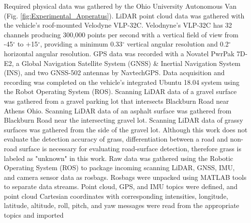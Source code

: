 \documentclass[journal,onecolumn]{IEEEtran}
\begin{document}
			{Required physical data was gathered by the Ohio University Autonomous Van (Fig. \ref{fig:Experimental_Apperatus}). LiDAR point cloud data was gathered with the vehicle's roof-mounted Velodyne VLP-32C. Velodnyne's VLP-32C has 32 channels producing 300,000 points per second with a vertical field of view from -45$^{\circ}$ to $+$15$^{\circ}$, providing a minimum 0.33$^{\circ}$ vertical angular resolution \cite{vlp_32c} and 0.2$^{\circ}$ horizontal angular resolution. GPS data was recorded with a Novatel PwrPak 7D-E2, a Global Navigation Satellite System (GNSS) \& Inertial Navigation System (INS), and two GNSS-502 antennas by NavtechGPS. Data acquisition and recording was completed on the vehicle's integrated Ubuntu 18.04 system using the Robot Operating System (ROS). Scanning LiDAR data of a gravel surface was gathered from a gravel parking lot that intersects Blackburn Road near Athens Ohio. Scanning LiDAR data of an asphalt surface was gathered from Blackburn Road near the intersecting gravel lot. Scanning LiDAR data of grassy surfaces was gathered from the side of the gravel lot. Although this work does not evaluate the detection accuracy of grass, differentiation between a road and non-road surface is necessary for evaluating road-surface detection, therefore grass is labeled as "unknown" in this work. Raw data was gathered using the Robotic Operating System (ROS) to package incoming scanning LiDAR, GNSS, IMU, and camera sensor data as rosbags. Rosbags were unpacked using MATLAB tools to separate data streams. Point cloud, GPS, and IMU topics were defined, and point cloud Cartesian coordinates with corresponding intensities, longitude, latitude, altitude, roll, pitch, and yaw messages were read from the appropriate topics and imported}
	
	
\end{document}
